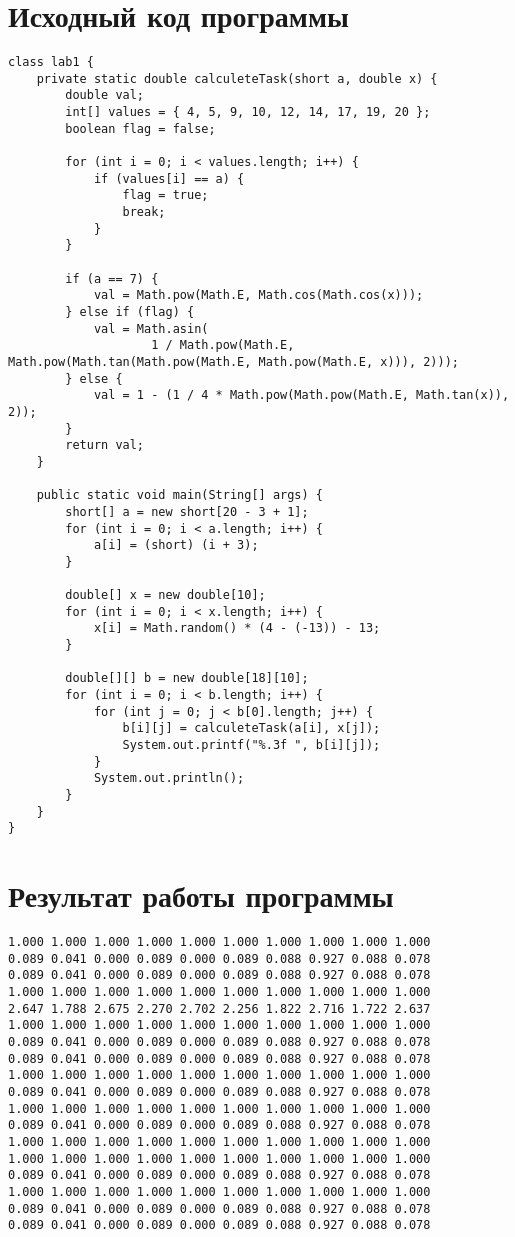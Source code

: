 \section{Исходный код программы}
\begin{lstlisting}
class lab1 {
    private static double calculeteTask(short a, double x) {
        double val;
        int[] values = { 4, 5, 9, 10, 12, 14, 17, 19, 20 };
        boolean flag = false;

        for (int i = 0; i < values.length; i++) {
            if (values[i] == a) {
                flag = true;
                break;
            }
        }

        if (a == 7) {
            val = Math.pow(Math.E, Math.cos(Math.cos(x)));
        } else if (flag) {
            val = Math.asin(
                    1 / Math.pow(Math.E, Math.pow(Math.tan(Math.pow(Math.E, Math.pow(Math.E, x))), 2)));
        } else {
            val = 1 - (1 / 4 * Math.pow(Math.pow(Math.E, Math.tan(x)), 2));
        }
        return val;
    }

    public static void main(String[] args) {
        short[] a = new short[20 - 3 + 1];
        for (int i = 0; i < a.length; i++) {
            a[i] = (short) (i + 3);
        }

        double[] x = new double[10];
        for (int i = 0; i < x.length; i++) {
            x[i] = Math.random() * (4 - (-13)) - 13;
        }

        double[][] b = new double[18][10];
        for (int i = 0; i < b.length; i++) {
            for (int j = 0; j < b[0].length; j++) {
                b[i][j] = calculeteTask(a[i], x[j]);
                System.out.printf("%.3f ", b[i][j]);
            }
            System.out.println();
        }
    }
}
\end{lstlisting}
\clearpage

\section{Результат работы программы}
\begin{lstlisting}
1.000 1.000 1.000 1.000 1.000 1.000 1.000 1.000 1.000 1.000 
0.089 0.041 0.000 0.089 0.000 0.089 0.088 0.927 0.088 0.078
0.089 0.041 0.000 0.089 0.000 0.089 0.088 0.927 0.088 0.078
1.000 1.000 1.000 1.000 1.000 1.000 1.000 1.000 1.000 1.000 
2.647 1.788 2.675 2.270 2.702 2.256 1.822 2.716 1.722 2.637
1.000 1.000 1.000 1.000 1.000 1.000 1.000 1.000 1.000 1.000
0.089 0.041 0.000 0.089 0.000 0.089 0.088 0.927 0.088 0.078
0.089 0.041 0.000 0.089 0.000 0.089 0.088 0.927 0.088 0.078
1.000 1.000 1.000 1.000 1.000 1.000 1.000 1.000 1.000 1.000
0.089 0.041 0.000 0.089 0.000 0.089 0.088 0.927 0.088 0.078
1.000 1.000 1.000 1.000 1.000 1.000 1.000 1.000 1.000 1.000
0.089 0.041 0.000 0.089 0.000 0.089 0.088 0.927 0.088 0.078 
1.000 1.000 1.000 1.000 1.000 1.000 1.000 1.000 1.000 1.000 
1.000 1.000 1.000 1.000 1.000 1.000 1.000 1.000 1.000 1.000
0.089 0.041 0.000 0.089 0.000 0.089 0.088 0.927 0.088 0.078
1.000 1.000 1.000 1.000 1.000 1.000 1.000 1.000 1.000 1.000
0.089 0.041 0.000 0.089 0.000 0.089 0.088 0.927 0.088 0.078
0.089 0.041 0.000 0.089 0.000 0.089 0.088 0.927 0.088 0.078 
\end{lstlisting}
